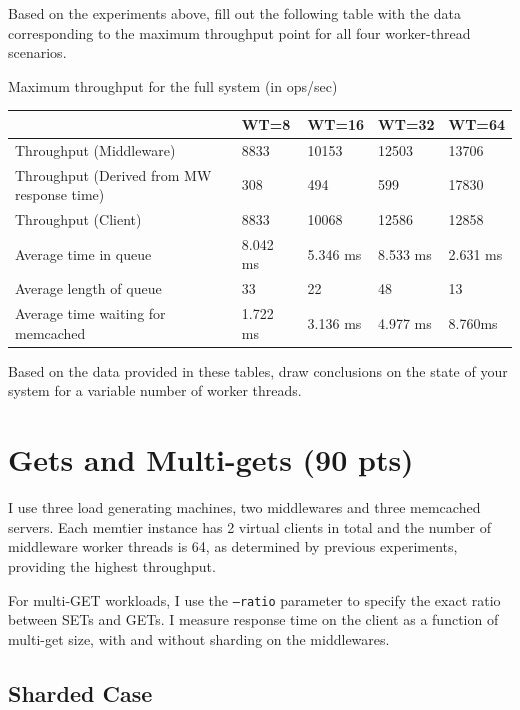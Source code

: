 \documentclass[11pt,a4paper]{article}
\begin{document}
Based on the experiments above, fill out the following table with the data corresponding to the maximum throughput point for all four worker-thread scenarios.

\begin{center}
	{Maximum throughput for the full system (in ops/sec) }
	\begin{tabular}{|l|p{1.5cm}|p{1.5cm}|p{1.5cm}|p{1.5cm}|}
		\hline                                            									& WT=8 & WT=16 & WT=32 & WT=64 \\ 
		\hline Throughput (Middleware)   								& 8833 & 10153 & 12503 & 13706 \\ 
		\hline Throughput (Derived from MW response time) & 308 & 494 & 599 & 17830  \\ 
		\hline Throughput (Client)              								& 8833 & 10068 & 12586 & 12858 \\ 
		\hline Average time in queue            							& 8.042 ms & 5.346 ms &  8.533 ms & 2.631 ms       \\ 
		\hline Average length of queue                    				&  33    		 &   22   	&  48  &   13   \\ 
		\hline Average time waiting for memcached         		& 1.722 ms  & 3.136 ms &  4.977 ms     & 8.760ms       \\ 
		\hline 
	\end{tabular}
\end{center}

Based on the data provided in these tables, draw conclusions on the state of your system for a variable number of worker threads.

\section{Gets and Multi-gets (90 pts)}

I use three load generating machines, two middlewares and three memcached servers. Each memtier instance has 2 virtual clients in total and the number of middleware worker threads is 64, as determined by previous experiments, providing the highest throughput.

For multi-GET workloads, I use the \texttt{--ratio} parameter to specify the exact ratio between SETs and GETs. I measure response time on the client as a function of multi-get size, with and without sharding on the middlewares.

\subsection{Sharded Case}
\end{document}
